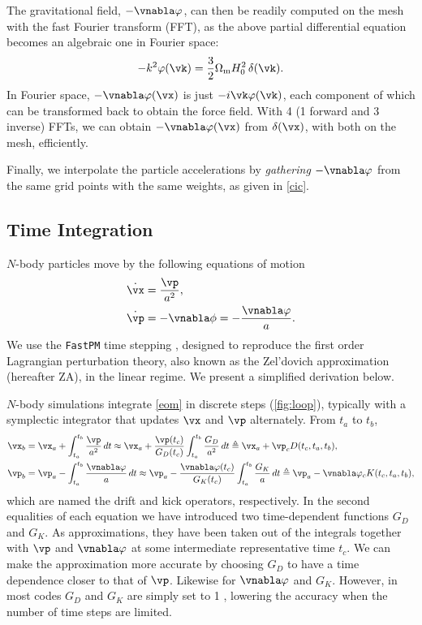 \documentclass[modern, trackchanges, dvipsnames]{aastex631}
\renewcommand{\d}{d}
\newcommand{\Omegam}{\Omega_\mathrm{m}}
\begin{document}
The gravitational field, $- \vnabla \varphi$, can then be readily
computed on the mesh with the fast Fourier transform (FFT), as the above
partial differential equation becomes an algebraic one in Fourier space:
%
\begin{equation}
- k^2 \varphi(\vk) = \frac32 \Omegam H_0^2 \, \delta(\vk).
\end{equation}
%
In Fourier space, $- \vnabla \varphi(\vx)$ is just $- i \vk
\varphi(\vk)$, each component of which can be transformed back to obtain
the force field.
With 4 (1 forward and 3 inverse) FFTs, we can obtain $- \vnabla
\varphi(\vx)$ from $\delta(\vx)$, with both on the mesh, efficiently.

Finally, we interpolate the particle accelerations by \emph{gathering}
$- \vnabla \varphi$ from the same grid points with the same weights, as
given in \eqref{cic}.


\vspace{1em}
\subsection{Time Integration}
\label{sec:integ}

$N$-body particles move by the following equations of motion
%
\begin{align}
\dot\vx &= \frac{\vp}{a^2}, \nonumber\\
\dot\vp &= -\vnabla\phi = - \frac{\vnabla\varphi}a.
\label{eom}
\end{align}
%
We use the \texttt{FastPM} time stepping \citep{FastPM}, designed to
reproduce the first order Lagrangian perturbation theory, also known as
the Zel'dovich approximation (hereafter ZA), in the linear regime.
We present a simplified derivation below.


$N$-body simulations integrate \eqref{eom} in discrete steps
(\autoref{fig:loop}), typically with a symplectic integrator that
updates $\vx$ and $\vp$ alternately.
From $t_a$ to $t_b$,
%
\begin{align}
\vx_b
  &= \vx_a + \int_{t_a}^{t_b} \frac{\vp}{a^2} \,\d t
  \approx \vx_a + \frac{\vp(t_c)}{G_D(t_c)}
    \int_{t_a}^{t_b} \frac{G_D}{a^2} \,\d t
  \triangleq \vx_a + \vp_c D(t_c, t_a, t_b), \nonumber\\
%
\vp_b
  &= \vp_a - \int_{t_a}^{t_b} \frac{\vnabla\varphi}a \,\d t
  \approx \vp_a - \frac{\vnabla\varphi(t_c)}{G_K(t_c)}
    \int_{t_a}^{t_b} \frac{G_K}a \,\d t
  \triangleq \vp_a - \vnabla\varphi_c K(t_c, t_a, t_b),
\label{eom_integ}
\end{align}
%
which are named the drift and kick operators, respectively.
In the second equalities of each equation we have introduced two
time-dependent functions $G_D$ and $G_K$.
As approximations, they have been taken out of the integrals together
with $\vp$ and $\vnabla\varphi$ at some intermediate representative time
$t_c$.
We can make the approximation more accurate by choosing $G_D$ to have a
time dependence closer to that of $\vp$.
Likewise for $\vnabla\varphi$ and $G_K$.
However, in most codes $G_D$ and $G_K$ are simply set to 1
\citep{QuinnEtAl1997}, lowering the accuracy when the number of time
steps are limited.
\end{document}
